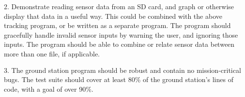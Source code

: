 \documentclass[onecolumn, draftclsnofoot,10pt, compsoc]{IEEEtran}
\begin{document}
\par
2. Demonstrate reading sensor data from an SD card, and graph or otherwise display that data in a useful way.  This could be combined with the above tracking program, or be written as a separate program.  The program should gracefully handle invalid sensor inputs by warning the user, and ignoring those inputs.  The program should be able to combine or relate sensor data between more than one file, if applicable.

\par
3. The ground station program should be robust and contain no mission-critical bugs.  The test suite should cover at least 80\% of the ground station's lines of code, with a goal of over 90\%.
\end{document}
